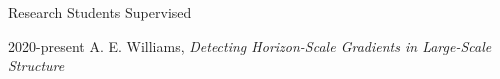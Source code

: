 \begin{cvlist}{Research Students Supervised}
\item[2020-present] A. E. Williams, \emph{Detecting Horizon-Scale Gradients in Large-Scale Structure}
\end{cvlist}